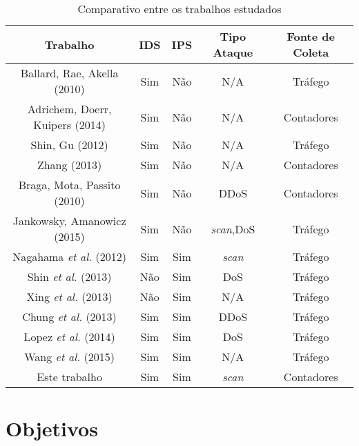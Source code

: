 \begin{table}[H]
  \centering
  \caption{Comparativo entre os trabalhos estudados}
  \begin{tabular}{|c|c|c|c|c|} \hline
	\textbf{Trabalho} & \textbf{IDS} & \textbf{IPS} & \textbf{Tipo Ataque} & \textbf{Fonte de Coleta} \\ \hline
	Ballard, Rae, Akella (2010)  & Sim & Não & N/A & Tráfego\\ \hline
	Adrichem, Doerr, Kuipers (2014) & Sim & Não & N/A & Contadores\\ \hline
	Shin, Gu (2012)     & Sim & Não & N/A & Tráfego\\ \hline
	Zhang (2013)    & Sim & Não & N/A & Contadores\\ \hline
	Braga, Mota, Passito (2010)    & Sim & Não & DDoS & Contadores\\ \hline
	Jankowsky, Amanowicz (2015) & Sim & Não & \textit{scan},DoS & Tráfego \\ \hline
	Nagahama \textit{et al.} (2012) & Sim & Sim & \textit{scan} & Tráfego\\ \hline
	Shin \textit{et al.} (2013)    & Não & Sim & DoS & Tráfego\\ \hline
	Xing \textit{et al.} (2013)     & Não & Sim & N/A & Tráfego \\ \hline
	Chung \textit{et al.} (2013)     & Sim & Sim & DDoS & Tráfego \\ \hline
	Lopez \textit{et al.} (2014)    & Sim & Sim & DoS & Tráfego \\ \hline
	Wang \textit{et al.} (2015)     & Sim & Sim & N/A & Tráfego \\ \hline
	Este trabalho & Sim & Sim & \textit{scan} & Contadores \\ \hline
  \end{tabular}
  \label{tab:trabalhos}
\end{table}

\section{Objetivos}
\label{sec:objetivos}

